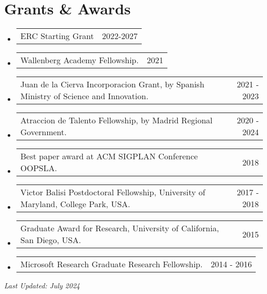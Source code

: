 \documentclass[letterpaper,11pt]{article}
\makeatletter
\newcommand{\resumeProjectHeading}[2]{
    \item
    \begin{tabular*}{0.97\textwidth}{l@{\extracolsep{\fill}}r}
      \small#1 & #2 \\
    \end{tabular*}\vspace{-7pt}
}
\newcommand{\resumeSubHeadingListStart}{\begin{itemize}[leftmargin=0.15in, label={}]}
\newcommand{\resumeSubHeadingListEnd}{\end{itemize}}
\makeatother
\begin{document}
 \section{Grants \& Awards}
 \resumeSubHeadingListStart
 \resumeProjectHeading
     {ERC Starting Grant}{2022-2027}
 \resumeProjectHeading
     {Wallenberg Academy Fellowship.}{2021}
 \resumeProjectHeading
     {Juan de la Cierva Incorporacion Grant, by Spanish Ministry of Science and Innovation.}{2021 - 2023}
 \resumeProjectHeading
     {Atraccion de Talento Fellowship, by Madrid Regional Government.}{2020 - 2024}
 \resumeProjectHeading
     {Best paper award at ACM SIGPLAN Conference OOPSLA.}{2018}
 \resumeProjectHeading
     {Victor Balisi Postdoctoral Fellowship, University of Maryland, College Park, USA.}{2017 - 2018}
 \resumeProjectHeading
     {Graduate Award for Research, University of California, San Diego, USA.}{2015}
 \resumeProjectHeading
     {Microsoft Research Graduate Research Fellowship.}{2014 - 2016}
 \resumeSubHeadingListEnd
 
 \vspace*{\fill}
 \hfill \emph{Last Updated: July 2024}
\end{document}
